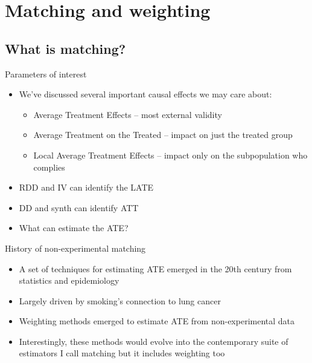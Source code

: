 \documentclass{beamer}
\begin{document}



\section{Matching and weighting}


\subsection{What is matching?}

\begin{frame}{Parameters of interest}

\begin{itemize}
	\item We've discussed several important causal effects we may care about:
		\begin{itemize}
		\item Average Treatment Effects -- most external validity
		\item Average Treatment on the Treated -- impact on just the treated group
		\item Local Average Treatment Effects -- impact only on the subpopulation who complies
		\end{itemize}
	\item RDD and IV can identify the LATE 
	\item DD and synth can identify ATT
	\item What can estimate the ATE?
\end{itemize}

\end{frame}


\begin{frame}{History of non-experimental matching}

\begin{itemize}

	\item A set of techniques for estimating ATE emerged in the 20th century from statistics and epidemiology
	\item Largely driven by smoking's connection to lung cancer
	\item Weighting methods emerged to estimate ATE from non-experimental data
	\item Interestingly, these methods would evolve into the contemporary suite of estimators I call matching but it includes weighting too

\end{itemize}

\end{frame}
\end{document}
